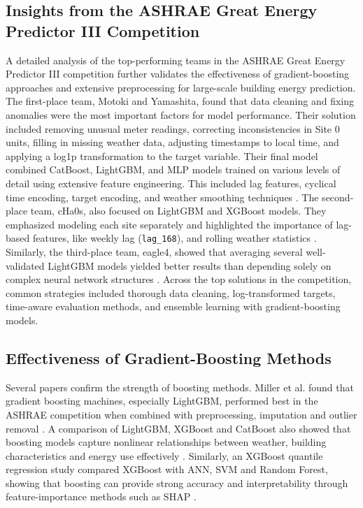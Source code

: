 \documentclass{article}
\begin{document}
\subsection{Insights from the ASHRAE Great Energy Predictor III Competition}
A detailed analysis of the top-performing teams in the ASHRAE Great Energy Predictor III competition further validates the effectiveness of gradient-boosting approaches and extensive preprocessing for large-scale building energy prediction. The first-place team, Motoki and Yamashita, found that data cleaning and fixing anomalies were the most important factors for model performance. Their solution included removing unusual meter readings, correcting inconsistencies in Site 0 units, filling in missing weather data, adjusting timestamps to local time, and applying a log1p transformation to the target variable. Their final model combined CatBoost, LightGBM, and MLP models trained on various levels of detail using extensive feature engineering. This included lag features, cyclical time encoding, target encoding, and weather smoothing techniques \cite{motoki2020}. The second-place team, cHa0s, also focused on LightGBM and XGBoost models. They emphasized modeling each site separately and highlighted the importance of lag-based features, like weekly lag (\texttt{lag\_168}), and rolling weather statistics \cite{chaos2020}. Similarly, the third-place team, eagle4, showed that averaging several well-validated LightGBM models yielded better results than depending solely on complex neural network structures \cite{eagle42020}. Across the top solutions in the competition, common strategies included thorough data cleaning, log-transformed targets, time-aware evaluation methods, and ensemble learning with gradient-boosting models. 

\subsection{Effectiveness of Gradient-Boosting Methods}
Several papers confirm the strength of boosting methods. Miller et al. found that gradient boosting machines, especially LightGBM, performed best in the ASHRAE competition when combined with preprocessing, imputation and outlier removal \cite{miller2022}. A comparison of LightGBM, XGBoost and CatBoost also showed that boosting models capture nonlinear relationships between weather, building characteristics and energy use effectively \cite{gbmcomparison}. Similarly, an XGBoost quantile regression study compared XGBoost with ANN, SVM and Random Forest, showing that boosting can provide strong accuracy and interpretability through feature-importance methods such as SHAP \cite{xgboostshap}. 
\end{document}
